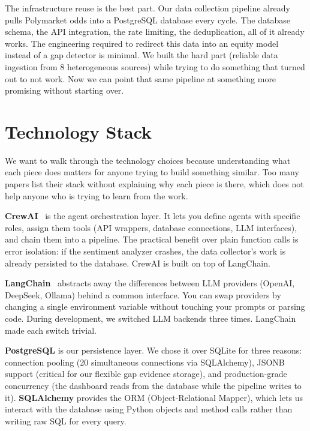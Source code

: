 \documentclass[conference]{IEEEtran}
\begin{document}
The infrastructure reuse is the best part. Our data collection pipeline already pulls Polymarket odds into a PostgreSQL database every cycle. The database schema, the API integration, the rate limiting, the deduplication, all of it already works. The engineering required to redirect this data into an equity model instead of a gap detector is minimal. We built the hard part (reliable data ingestion from 8 heterogeneous sources) while trying to do something that turned out to not work. Now we can point that same pipeline at something more promising without starting over.

\section{Technology Stack}

We want to walk through the technology choices because understanding what each piece does matters for anyone trying to build something similar. Too many papers list their stack without explaining why each piece is there, which does not help anyone who is trying to learn from the work.

\textbf{CrewAI}~\cite{crewai2024} is the agent orchestration layer. It lets you define agents with specific roles, assign them tools (API wrappers, database connections, LLM interfaces), and chain them into a pipeline. The practical benefit over plain function calls is error isolation: if the sentiment analyzer crashes, the data collector's work is already persisted to the database. CrewAI is built on top of LangChain.

\textbf{LangChain}~\cite{langchain2023} abstracts away the differences between LLM providers (OpenAI, DeepSeek, Ollama) behind a common interface. You can swap providers by changing a single environment variable without touching your prompts or parsing code. During development, we switched LLM backends three times. LangChain made each switch trivial.

\textbf{PostgreSQL} is our persistence layer. We chose it over SQLite for three reasons: connection pooling (20 simultaneous connections via SQLAlchemy), JSONB support (critical for our flexible gap evidence storage), and production-grade concurrency (the dashboard reads from the database while the pipeline writes to it). \textbf{SQLAlchemy} provides the ORM (Object-Relational Mapper), which lets us interact with the database using Python objects and method calls rather than writing raw SQL for every query.
\end{document}
